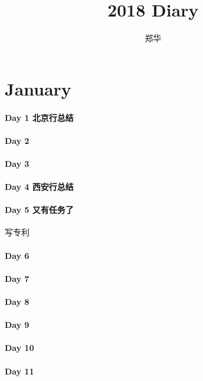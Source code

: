\documentclass[UTF8,a4paper,8pt]{ctexart}
\author{郑华}
\title{2018 Diary}
\begin{document}
 
	\maketitle
	
\newpage
\section{January}
	\paragraph{Day 1   北京行总结    \quad     }
	\paragraph{Day 2       \quad     }
	\paragraph{Day 3       \quad     }
	\paragraph{Day 4   西安行总结    \quad     }
	\paragraph{Day 5   又有任务了    \quad     }
		写专利
	\paragraph{Day 6       \quad     }
	\paragraph{Day 7       \quad     }
	\paragraph{Day 8       \quad     }
	\paragraph{Day 9       \quad     }
	\paragraph{Day 10      \quad     }
	\paragraph{Day 11      \quad     }
\end{document}
